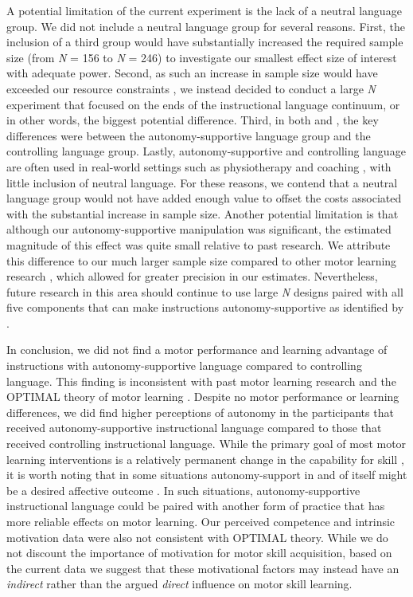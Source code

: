 \documentclass[doc,floatsintext,donotrepeattitle,letterpaper,12pt]{apa7}
\begin{document}
A potential limitation of the current experiment is the lack of a neutral language group. We did not include a neutral language group for several reasons. First, the inclusion of a third group would have substantially increased the required sample size (from \emph{N} = 156 to \emph{N} = 246) to investigate our smallest effect size of interest with adequate power. Second, as such an increase in sample size would have exceeded our resource constraints \autocite{lakens2022,lenth2001}, we instead decided to conduct a large \emph{N} experiment that focused on the ends of the instructional language continuum, or in other words, the biggest potential difference. Third, in both \textcite{reeve2011} and \textcite{hooyman2014}, the key differences were between the autonomy-supportive language group and the controlling language group. Lastly, autonomy-supportive and controlling language are often used in real-world settings such as physiotherapy \autocite[e.g.,][]{murray2015} and  coaching \autocite[e.g.,][]{bartholomew2009,carroll2021}, with little inclusion of neutral language. For these reasons, we contend that a neutral language group would not have added enough value to offset the costs associated with the substantial increase in sample size. Another potential limitation is that although our autonomy-supportive manipulation was significant, the estimated magnitude of this effect was quite small relative to past research. We attribute this difference to our much larger sample size compared to other motor learning research \autocite[e.g.,][]{hooyman2014}, which allowed for greater precision in our estimates. Nevertheless, future research in this area should continue to use large \emph{N} designs paired with all five components that can make instructions autonomy-supportive as identified by \textcite{su2011}.

In conclusion, we did not find a motor performance and learning advantage of instructions with autonomy-supportive language compared to controlling language. This finding is inconsistent with past motor learning research \autocite[e.g.,][]{hooyman2014} and the OPTIMAL theory of motor learning \autocite{wulf2016}. Despite no motor performance or learning differences, we did find higher perceptions of autonomy in the participants that received autonomy-supportive instructional language compared to those that received controlling instructional language. While the primary goal of most motor learning interventions is a relatively permanent change in the capability for skill \autocite{schmidt2019}, it is worth noting that in some situations autonomy-support in and of itself might be a desired affective outcome \autocite[e.g.,][]{stemarie2020a}. In such situations, autonomy-supportive instructional language could be paired with another form of practice that has more reliable effects on motor learning. Our perceived competence and intrinsic motivation data were also not consistent with OPTIMAL theory. While we do not discount the importance of motivation for motor skill acquisition, based on the current data we suggest that these motivational factors may instead have an \emph{indirect} \autocite[e.g.,][]{salmoni1984} rather than the argued \emph{direct} \autocite[e.g.,][]{wulf2016} influence on motor skill learning.
\end{document}
